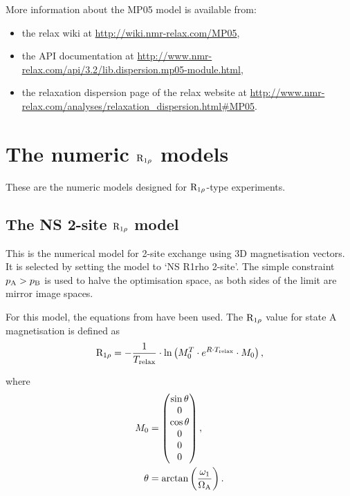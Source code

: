More information about the MP05 model is available from:
\begin{itemize}
  \item the relax wiki at \url{http://wiki.nmr-relax.com/MP05},
  \item the API documentation at \url{http://www.nmr-relax.com/api/3.2/lib.dispersion.mp05-module.html},
  \item the relaxation dispersion page of the relax website at \url{http://www.nmr-relax.com/analyses/relaxation\_dispersion.html#MP05}.
\end{itemize}




\section{The numeric $\mathrm{R}_{1\rho}$ models}
\label{sect: dispersion: numeric R1rho models}

These are the numeric models designed for $\mathrm{R}_{1\rho}$-type experiments.



\subsection{The NS 2-site $\mathrm{R}_{1\rho}$ model}
\label{sect: dispersion: NS R1rho 2-site model}

This is the numerical model for 2-site exchange using 3D magnetisation vectors.
It is selected by setting the model to `NS R1rho 2-site'.
The simple constraint $p_{\textrm{A}} > p_{\textrm{B}}$ is used to halve the optimisation space, as both sides of the limit are mirror image spaces.

For this model, the equations from \citet{Korzhnev05a} have been used.
The $\mathrm{R}_{1\rho}$ value for state A magnetisation is defined as
\begin{equation}
    \mathrm{R}_{1\rho} = - \frac{1}{T_{\textrm{relax}}}  \cdot \ln \left( M_0^T \cdot e^{R \cdot T_{\textrm{relax}}} \cdot M_0 \right),
\end{equation}

where
\begin{align}
    M_0    &= \begin{pmatrix} \sin{\theta} \\ 0 \\ \cos{\theta} \\ 0 \\ 0 \\ 0  \end{pmatrix}, \\
    \theta &= \arctan \left( \frac{\omega_1}{\Omega_{\textrm{A}}} \right).
\end{align}

